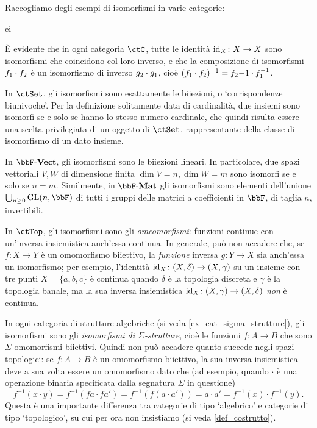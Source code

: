 \begin{examples}\label{esempi_di_iso}
 Raccogliamo degli esempi di isomorfismi in varie categorie:
 \begin{enumtag}{ei}
  \item \label{ei_1} È evidente che in ogni categoria \(\ctC\), tutte le identità \(\mathrm{id}_X \colon X\to X\) sono isomorfismi che coincidono col loro inverso, e che la composizione di isomorfismi \(f_1\cdot f_2\) è un isomorfismo di inverso \(g_2\cdot g_1\), cioè \((f_1\cdot f_2)^{-1} = f_2 {-1}\cdot f_1^{-1}\).
  \item \label{ei_2} In \(\ctSet\), gli isomorfismi sono esattamente le biiezioni, o `corrispondenze biunivoche'. Per la definizione solitamente data di cardinalità, due insiemi sono isomorfi se e solo se hanno lo stesso numero cardinale, che quindi risulta essere una scelta privilegiata di un oggetto di \(\ctSet\), rappresentante della classe di isomorfismo di un dato insieme.
  \item \label{ei_3} In \(\ctVect\), gli isomorfismi sono le biiezioni lineari. In particolare, due spazi vettoriali \(V,W\) di dimensione finita \(\dim V=n,\dim W=m\) sono isomorfi se e solo se \(n=m\). Similmente, in \(\ctMat\) gli isomorfismi sono elementi dell'unione \(\bigcup_{n\ge 0}\text{GL}(n,\bbF)\) di tutti i gruppi delle matrici a coefficienti in \(\bbF\), di taglia \(n\), invertibili.
  \item \label{ei_4} In \(\ctTop\), gli isomorfismi sono gli \emph{omeomorfismi}: funzioni continue con un'inversa insiemistica anch'essa continua. In generale, può non accadere che, se \(f \colon X\to Y\) è un omomorfismo biiettivo, la \emph{funzione} inversa \(g \colon Y\to X\) sia anch'essa un isomorfismo; per esempio, l'identità \(\mathrm{id}_X \colon (X,\delta)\to (X,\gamma)\) su un insieme con tre punti \(X=\{a,b,c\}\) è continua quando \(\delta\) è la topologia discreta e \(\gamma\) è la topologia banale, ma la sua inversa insiemistica \(\mathrm{id}_X \colon (X,\gamma)\to(X,\delta)\) \emph{non} è continua.
  \item \label{ei_5} In ogni categoria di strutture algebriche (si veda \ref{ex_cat_sigma_strutture}), gli isomorfismi sono gli \emph{isomorfismi di \(\Sigma\)-strutture}, cioè le funzioni \(f \colon A\to B\) che sono \(\Sigma\)-omomorfismi biiettivi. Quindi non può accadere quanto succede negli spazi topologici: se \(f \colon A\to B\) è un omomorfismo biiettivo, la sua inversa insiemistica deve a sua volta essere un omomorfismo dato che (ad esempio, quando \(\cdot\) è una operazione binaria specificata dalla segnatura \(\Sigma\) in questione)
  \[f^{-1}(x\cdot y) = f^{-1}(fa\cdot fa') = f^{-1}(f(a\cdot a')) = a\cdot a' = f^{-1}(x)\cdot f^{-1}(y).\]
  Questa è una importante differenza tra categorie di tipo `algebrico' e categorie di tipo `topologico', su cui per ora non insistiamo (si veda \ref{def_costrutto}).
 \end{enumtag}
\end{examples}
